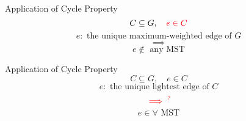 \begin{frame}{}
  \begin{exampleblock}{Application of Cycle Property }
    \[
      C \subseteq G, \quad \textcolor{red}{e \in C}
    \]
    \[
      e: \text{ the unique maximum-weighted edge of } G
    \]
    \[
      \implies
    \]
    \[
      e \notin \text{ any MST}
    \]
  \end{exampleblock}

  \pause
  \vspace{0.50cm}
  \centerline{}
\end{frame}

\begin{frame}{}
  \begin{exampleblock}{Application of Cycle Property }
    \[
      C \subseteq G, \quad e \in C
    \]
    \[
      e: \text{ the unique lightest edge of } C
    \]
    \[
      \textcolor{red}{\implies^{?}}
    \]
    \[
      e \in \forall \text{ MST}
    \]
  \end{exampleblock}

  \pause
  \vspace{0.50cm}
\end{frame}

